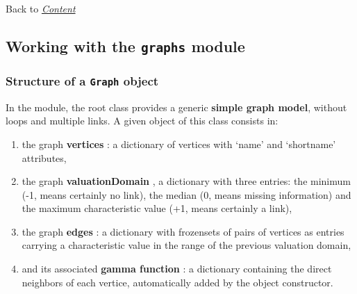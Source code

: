 \documentclass[letterpaper,10pt,english]{sphinxmanual}
\begin{document}
Back to {\hyperref[tutorial:tutorial-label]{\emph{Content}}}


\subsection{Working with the \texttt{graphs} module}
\label{tutorial:working-with-the-graphs-module}\label{tutorial:graphs-tutorial-label}

\subsubsection{Structure of a \texttt{Graph} object}
\label{tutorial:structure-of-a-graph-object}
In the  module, the root  class provides a generic \textbf{simple graph model}, without loops and multiple links. A given object of this class consists in:
\begin{enumerate}
\item {} 
the graph \textbf{vertices} : a dictionary of vertices with `name' and `shortname' attributes,

\item {} 
the graph \textbf{valuationDomain} , a dictionary with three entries: the minimum (-1, means certainly no link), the median (0, means missing information) and the maximum characteristic value (+1, means certainly a link),

\item {} 
the graph \textbf{edges} : a dictionary with frozensets of pairs of vertices as entries carrying a characteristic value in the range of the previous valuation domain,

\item {} 
and its associated \textbf{gamma function} : a dictionary containing the direct neighbors of each vertice, automatically added by the object constructor.

\end{enumerate}
\end{document}
